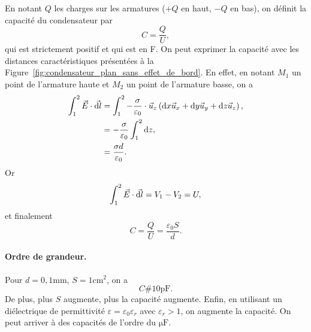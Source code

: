             En notant $Q$ les charges sur les armatures ($+Q$ en haut, $-Q$ en bas), on définit la capacité du condensateur par 
            \begin{equation}
                \boxed{
                    C=\frac{Q}{U},
                }
            \end{equation}
            qui est strictement positif et qui est en \si{\farad}. On peut exprimer la capacité avec les distances caractéristiques présentées à la Figure~\ref{fig:condensateur_plan_sans_effet_de_bord}. En effet, en notant $M_1$ un point de l'armature haute et $M_2$ un point de l'armature basse, on a 
            \begin{align}
                \int_{1}^{2}\vec{E}\cdot\vec{\mathrm{d} l}
                &=
                \int_{1}^{2}-\frac{\sigma}{\varepsilon_0}\cdot\vec{u}_z\left(\mathrm{d} x\vec{u}_x+\mathrm{d} y\vec{u}_y+\mathrm{d} z\vec{u}_z\right),\\
                &=
                -\frac{\sigma}{\varepsilon_0}\int_{1}^{2}\mathrm{d} z,\\
                &=
                \frac{\sigma d}{\varepsilon_0}.
            \end{align}
            Or 
            \begin{equation}
                \int_{1}^{2}\vec{E}\cdot\vec{\mathrm{d} l}=V_1-V_2=U,
            \end{equation}
            et finalement
            \begin{equation}
                \boxed{
                    C=\frac{Q}{U}=\frac{\varepsilon_0 S}{d}.
                }
            \end{equation}

            \paragraph{Ordre de grandeur.} Pour $d=0,1\si{\milli\metre}$, $S=1\si{\centi\metre\squared}$, on a 
            \begin{equation}
                C\#10\si{\pico\farad}.
            \end{equation}
            De plus, plus $S$ augmente, plus la capacité augmente. Enfin, en utilisant un diélectrique de permittivité $\varepsilon=\varepsilon_0\varepsilon_r$ avec $\varepsilon_r>1$, on augmente la capacité. On peut arriver à des capacités de l'ordre du $\si{\micro\farad}$.
